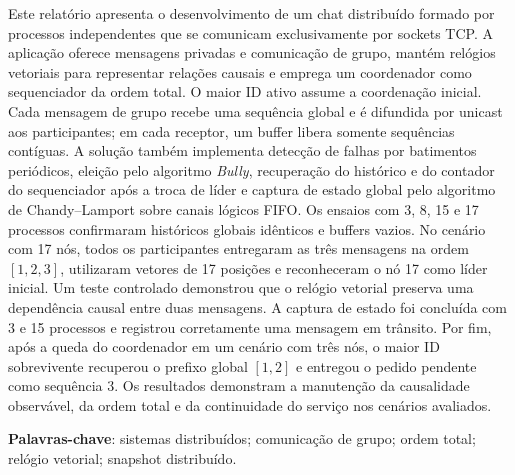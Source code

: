 %
%

\begin{RESUMO}
\thispagestyle{empty}

    \noindent Este relatório apresenta o desenvolvimento de um chat distribuído
    formado por processos independentes que se comunicam exclusivamente por
    sockets TCP. A aplicação oferece mensagens privadas e comunicação de grupo,
    mantém relógios vetoriais para representar relações causais e emprega um
    coordenador como sequenciador da ordem total. O maior ID ativo assume a
    coordenação inicial. Cada mensagem de grupo recebe uma sequência global e é
    difundida por unicast aos participantes; em cada receptor, um buffer libera
    somente sequências contíguas. A solução também implementa detecção de falhas
    por batimentos periódicos, eleição pelo algoritmo \textit{Bully}, recuperação
    do histórico e do contador do sequenciador após a troca de líder e captura de
    estado global pelo algoritmo de Chandy--Lamport sobre canais lógicos FIFO. Os
    ensaios com 3, 8, 15 e 17 processos confirmaram históricos globais idênticos e
    buffers vazios. No cenário com 17 nós, todos os participantes entregaram as
    três mensagens na ordem $[1,2,3]$, utilizaram vetores de 17 posições e
    reconheceram o nó 17 como líder inicial. Um teste controlado demonstrou que o
    relógio vetorial preserva uma dependência causal entre duas mensagens. A
    captura de estado foi concluída com 3 e 15 processos e registrou corretamente
    uma mensagem em trânsito. Por fim, após a queda do coordenador em um cenário
    com três nós, o maior ID sobrevivente recuperou o prefixo global $[1,2]$ e
    entregou o pedido pendente como sequência 3. Os resultados demonstram a
    manutenção da causalidade observável, da ordem total e da continuidade do
    serviço nos cenários avaliados.

    \vspace*{0.5cm}\noindent\textbf{Palavras-chave}: sistemas distribuídos;
    comunicação de grupo; ordem total; relógio vetorial; snapshot distribuído.

\end{RESUMO}
